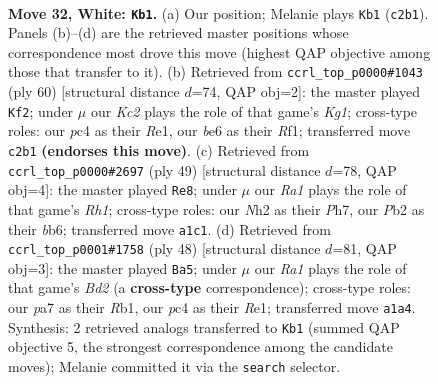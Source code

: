 \documentclass[11pt]{article}
\begin{document}
\clearpage

\begin{figure}[p]\centering
\begin{subfigure}{0.46\textwidth}\centering
\resizebox{\linewidth}{!}{%
\newchessgame
\chessboard[
  setfen={rk3b2/pp4pr/2p1b2p/P4p2/2pP3P/2B1P3/1PK2PPN/R6R w - - 0 32},
  showmover=false,
  pgfstyle=straightmove, color=movearrow, markmove={c2-b1}
]}
\caption{}
\end{subfigure}\hfill
\begin{subfigure}{0.46\textwidth}\centering
\resizebox{\linewidth}{!}{%
\newchessgame
\chessboard[
  setfen={3rrb2/p4p1k/1p1ppP1p/7p/P1PBP3/1P6/6PP/4RRK1 w - - 2 31},
  showmover=false,
  pgfstyle=straightmove, color=movearrow, markmove={g1-f2}
]}
\caption{}
\end{subfigure}
\\[4pt]
\begin{subfigure}{0.46\textwidth}\centering
\resizebox{\linewidth}{!}{%
\newchessgame
\chessboard[
  setfen={2b4r/1p3k1p/pBp1nbp1/P2pp3/8/2P5/1PB2PPP/R4RK1 b - - 4 25},
  showmover=false,
  pgfstyle=straightmove, color=movearrow, markmove={h8-e8}
]}
\caption{}
\end{subfigure}\hfill
\begin{subfigure}{0.46\textwidth}\centering
\resizebox{\linewidth}{!}{%
\newchessgame
\chessboard[
  setfen={3r4/5rbk/3pbnpp/4pp2/7P/3PP1P1/3B1PBN/1R2R1K1 w - - 0 25},
  showmover=false,
  pgfstyle=straightmove, color=movearrow, markmove={d2-a5}
]}
\caption{}
\end{subfigure}
\caption{\textbf{Move 32, White: \texttt{Kb1}.} (a) Our position; Melanie plays \texttt{Kb1} (\texttt{c2b1}). Panels (b)--(d) are the retrieved master positions whose correspondence most drove this move (highest QAP objective among those that transfer to it). (b) Retrieved from \texttt{ccrl\_top\_p0000\#1043} (ply 60) [structural distance $d$=74, QAP obj=2]: the master played \texttt{Kf2}; under $\mu$ our \emph{Kc2} plays the role of that game's \emph{Kg1}; cross-type roles: our \emph{p}c4 as their \emph{R}e1, our \emph{b}e6 as their \emph{R}f1; transferred move \texttt{c2b1} \textbf{(endorses this move)}. (c) Retrieved from \texttt{ccrl\_top\_p0000\#2697} (ply 49) [structural distance $d$=78, QAP obj=4]: the master played \texttt{Re8}; under $\mu$ our \emph{Ra1} plays the role of that game's \emph{Rh1}; cross-type roles: our \emph{N}h2 as their \emph{P}h7, our \emph{P}b2 as their \emph{b}b6; transferred move \texttt{a1c1}. (d) Retrieved from \texttt{ccrl\_top\_p0001\#1758} (ply 48) [structural distance $d$=81, QAP obj=3]: the master played \texttt{Ba5}; under $\mu$ our \emph{Ra1} plays the role of that game's \emph{Bd2} (a \textbf{cross-type} correspondence); cross-type roles: our \emph{p}a7 as their \emph{R}b1, our \emph{p}c4 as their \emph{R}e1; transferred move \texttt{a1a4}. Synthesis: 2 retrieved analogs transferred to \texttt{Kb1} (summed QAP objective 5, the strongest correspondence among the candidate moves); Melanie committed it via the \texttt{search} selector.}
\label{fig:thought-m62}
\end{figure}
\end{document}
